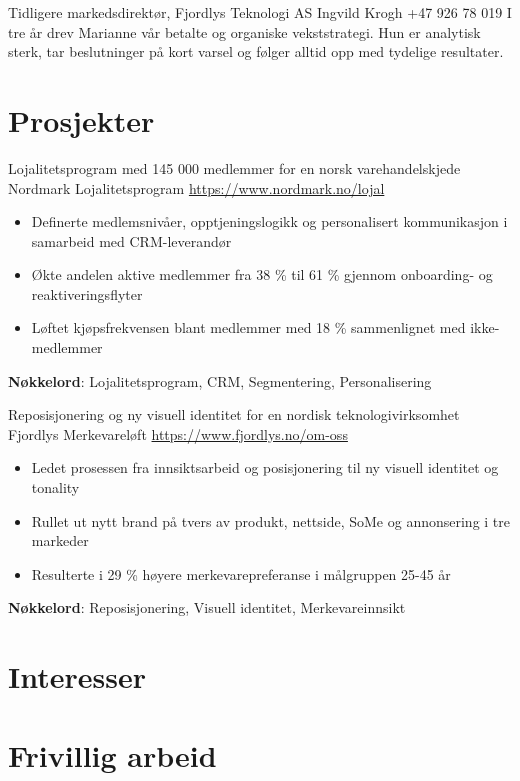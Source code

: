 \documentclass[a4paper, serif, 10pt]{moderncv}
\begin{document}
        {Tidligere markedsdirektør, Fjordlys Teknologi AS}
        {Ingvild Krogh}
        {+47 926 78 019}
        {}
        {I tre år drev Marianne vår betalte og organiske vekststrategi. Hun er analytisk sterk, tar beslutninger på kort varsel og følger alltid opp med tydelige resultater.}
\section{Prosjekter}

        {Lojalitetsprogram med 145 000 medlemmer for en norsk varehandelskjede}
        {Nordmark Lojalitetsprogram}
        {\url{https://www.nordmark.no/lojal}}
        {}
        {\begin{itemize}
\item Definerte medlemsnivåer, opptjeningslogikk og personalisert kommunikasjon i samarbeid med CRM-leverandør
\item Økte andelen aktive medlemmer fra 38 \% til 61 \% gjennom onboarding- og reaktiveringsflyter
\item Løftet kjøpsfrekvensen blant medlemmer med 18 \% sammenlignet med ikke-medlemmer
\end{itemize}
\textbf{Nøkkelord}: Lojalitetsprogram, CRM, Segmentering, Personalisering}

        {Reposisjonering og ny visuell identitet for en nordisk teknologivirksomhet}
        {Fjordlys Merkevareløft}
        {\url{https://www.fjordlys.no/om-oss}}
        {}
        {\begin{itemize}
\item Ledet prosessen fra innsiktsarbeid og posisjonering til ny visuell identitet og tonality
\item Rullet ut nytt brand på tvers av produkt, nettside, SoMe og annonsering i tre markeder
\item Resulterte i 29 \% høyere merkevarepreferanse i målgruppen 25-45 år
\end{itemize}
\textbf{Nøkkelord}: Reposisjonering, Visuell identitet, Merkevareinnsikt}
\section{Interesser}

\section{Frivillig arbeid}
\end{document}
